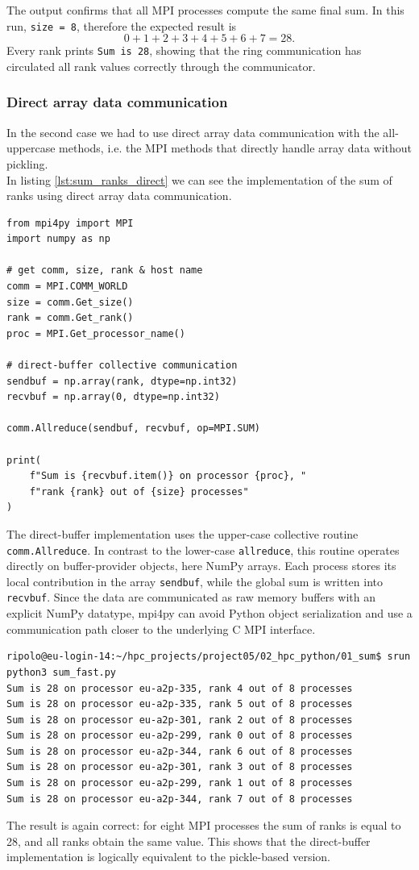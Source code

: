 \documentclass[unicode,10pt,a4paper,oneside,numbers=endperiod,openany]{scrartcl}
\begin{document}
The output confirms that all MPI processes compute the same final sum. In this run,
\texttt{size = 8}, therefore the expected result is
\[
0 + 1 + 2 + 3 + 4 + 5 + 6 + 7 = 28.
\]
Every rank prints \texttt{Sum is 28}, showing that the ring communication has circulated all rank
values correctly through the communicator.
\subsubsection{Direct array data communication}
In the second case we had to use direct array data communication with the all-uppercase methods, i.e. the MPI methods that directly handle array data without pickling.\\
In listing \ref{lst:sum_ranks_direct} we can see the implementation of the sum of ranks using direct array data communication.
\begin{lstlisting}[style=grayverbatim,label={lst:sum_ranks_direct},caption={Sum of ranks using direct array data communication}]
from mpi4py import MPI
import numpy as np

# get comm, size, rank & host name
comm = MPI.COMM_WORLD
size = comm.Get_size()
rank = comm.Get_rank()
proc = MPI.Get_processor_name()

# direct-buffer collective communication
sendbuf = np.array(rank, dtype=np.int32)
recvbuf = np.array(0, dtype=np.int32)

comm.Allreduce(sendbuf, recvbuf, op=MPI.SUM)

print(
    f"Sum is {recvbuf.item()} on processor {proc}, "
    f"rank {rank} out of {size} processes"
)
\end{lstlisting}
The direct-buffer implementation uses the upper-case collective routine
\texttt{comm.Allreduce}. In contrast to the lower-case \texttt{allreduce},
this routine operates directly on buffer-provider objects, here NumPy arrays.
Each process stores its local contribution in the array \texttt{sendbuf}, while
the global sum is written into \texttt{recvbuf}. Since the data are communicated
as raw memory buffers with an explicit NumPy datatype, mpi4py can avoid Python
object serialization and use a communication path closer to the underlying C MPI
interface.
\begin{lstlisting}[style=grayverbatim,label={lst:sum_ranks_direct_output},caption={Output of the sum of ranks using direct array data communication}]
ripolo@eu-login-14:~/hpc_projects/project05/02_hpc_python/01_sum$ srun python3 sum_fast.py
Sum is 28 on processor eu-a2p-335, rank 4 out of 8 processes
Sum is 28 on processor eu-a2p-335, rank 5 out of 8 processes
Sum is 28 on processor eu-a2p-301, rank 2 out of 8 processes
Sum is 28 on processor eu-a2p-299, rank 0 out of 8 processes
Sum is 28 on processor eu-a2p-344, rank 6 out of 8 processes
Sum is 28 on processor eu-a2p-301, rank 3 out of 8 processes
Sum is 28 on processor eu-a2p-299, rank 1 out of 8 processes
Sum is 28 on processor eu-a2p-344, rank 7 out of 8 processes
\end{lstlisting}
The result is again correct: for eight MPI processes the sum of ranks is equal to 28, and all ranks
obtain the same value. This shows that the direct-buffer implementation is logically equivalent to the pickle-based version.
\end{document}
